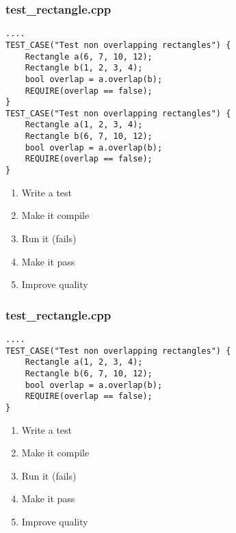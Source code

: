 \begin{frame}[fragile]
\frametitle{test\_rectangle.cpp}
\begin{minipage}[t]{0.48\linewidth}
\begin{lstlisting}
....
TEST_CASE("Test non overlapping rectangles") {
    Rectangle a(6, 7, 10, 12);
    Rectangle b(1, 2, 3, 4);
    bool overlap = a.overlap(b);
    REQUIRE(overlap == false);
}
TEST_CASE("Test non overlapping rectangles") {
    Rectangle a(1, 2, 3, 4);
    Rectangle b(6, 7, 10, 12);
    bool overlap = a.overlap(b);
    REQUIRE(overlap == false);
}
\end{lstlisting}
\end{minipage}\hfill
\begin{minipage}[t]{0.28\linewidth}
  \small
  \begin{enumerate} 
    \item \textcolor{deadcolor}{Write a test}
    \item \textcolor{deadcolor}{Make it compile}
    \item \textcolor{deadcolor}{Run it (fails)}
    \item \textcolor{deadcolor}{Make it pass}
    \item \textcolor{activecolor}{Improve quality}
  \end{enumerate} 
\end{minipage}
\end{frame}

\begin{frame}[fragile]
\frametitle{test\_rectangle.cpp}
\begin{minipage}[t]{0.48\linewidth}
\begin{lstlisting}
....
TEST_CASE("Test non overlapping rectangles") {
    Rectangle a(1, 2, 3, 4);
    Rectangle b(6, 7, 10, 12);
    bool overlap = a.overlap(b);
    REQUIRE(overlap == false);
}
\end{lstlisting}
\end{minipage}\hfill
\begin{minipage}[t]{0.28\linewidth}
  \small
  \begin{enumerate} 
    \item \textcolor{activecolor}{Write a test}
    \item \textcolor{deadcolor}{Make it compile}
    \item \textcolor{deadcolor}{Run it (fails)}
    \item \textcolor{deadcolor}{Make it pass}
    \item \textcolor{deadcolor}{Improve quality}
  \end{enumerate} 
\end{minipage}
\end{frame}

